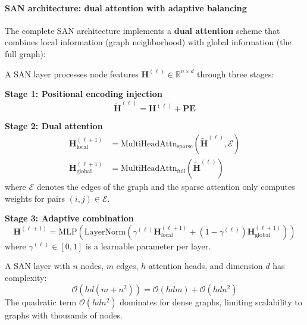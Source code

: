 \paragraph{SAN architecture: dual attention with adaptive balancing}

The complete SAN architecture implements a \textbf{dual attention} scheme that combines local information (graph neighborhood) with global information (the full graph):

\begin{definition}\label{def:san_layer}
A SAN layer processes node features $\mathbf{H}^{(\ell)} \in \mathbb{R}^{n \times d}$ through three stages:

\textbf{Stage 1: Positional encoding injection}
\begin{equation}
    \tilde{\mathbf{H}}^{(\ell)} = \mathbf{H}^{(\ell)} + \mathbf{PE}
    \label{eq:san_pe_injection}
\end{equation}

\textbf{Stage 2: Dual attention}
\begin{align}
    \mathbf{H}_{\text{local}}^{(\ell+1)} &= \text{MultiHeadAttn}_{\text{sparse}}\left(\tilde{\mathbf{H}}^{(\ell)}, \mathcal{E}\right) \label{eq:san_local_attn} \\
    \mathbf{H}_{\text{global}}^{(\ell+1)} &= \text{MultiHeadAttn}_{\text{full}}\left(\tilde{\mathbf{H}}^{(\ell)}\right) \label{eq:san_global_attn}
\end{align}
where $\mathcal{E}$ denotes the edges of the graph and the sparse attention only computes weights for pairs $(i,j) \in \mathcal{E}$.

\textbf{Stage 3: Adaptive combination}
\begin{equation}
    \mathbf{H}^{(\ell+1)} = \text{MLP}\left(\text{LayerNorm}\left(\gamma^{(\ell)} \mathbf{H}_{\text{local}}^{(\ell+1)} + (1-\gamma^{(\ell)}) \mathbf{H}_{\text{global}}^{(\ell+1)}\right)\right)
    \label{eq:san_adaptive_combination}
\end{equation}
where $\gamma^{(\ell)} \in [0,1]$ is a learnable parameter per layer.
\end{definition}

\begin{proposition}\label{prop:san_complexity}
A SAN layer with $n$ nodes, $m$ edges, $h$ attention heads, and dimension $d$ has complexity:
\begin{equation}
    \mathcal{O}(hd(m + n^2)) = \mathcal{O}(hdm) + \mathcal{O}(hdn^2)
    \label{eq:san_complexity}
\end{equation}
The quadratic term $\mathcal{O}(hdn^2)$ dominates for dense graphs, limiting scalability to graphs with thousands of nodes.
\end{proposition}

